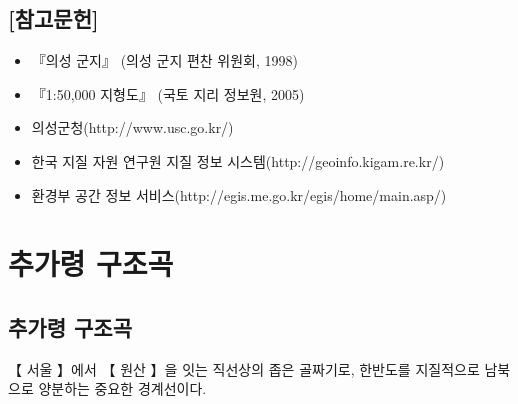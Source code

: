 \documentclass[12pt,a4paper]{book}
\newcommand{\SectionMargin}			{\newpage  \null \vskip 0cm}
\begin{document}
	\section{[참고문헌]}
	
		\begin{itemize}[itemsep=0.0em]
		\item	『의성 군지』 (의성 군지 편찬 위원회, 1998)
		\item	『1:50,000 지형도』 (국토 지리 정보원, 2005)
		\item	의성군청(http://www.usc.go.kr/)
		\item	한국 지질 자원 연구원 지질 정보 시스템(http://geoinfo.kigam.re.kr/)
		\item	환경부 공간 정보 서비스(http://egis.me.go.kr/egis/home/main.asp/)
		\end{itemize}
	


\newpage
\chapter{추가령 구조곡}




	\SectionMargin
	\section{추가령 구조곡}
	\null

			【 서울 】에서 【 원산 】을 잇는 직선상의 좁은 골짜기로, 
			한반도를 지질적으로 남북으로 양분하는 중요한 경계선이다.\\
\end{document}
